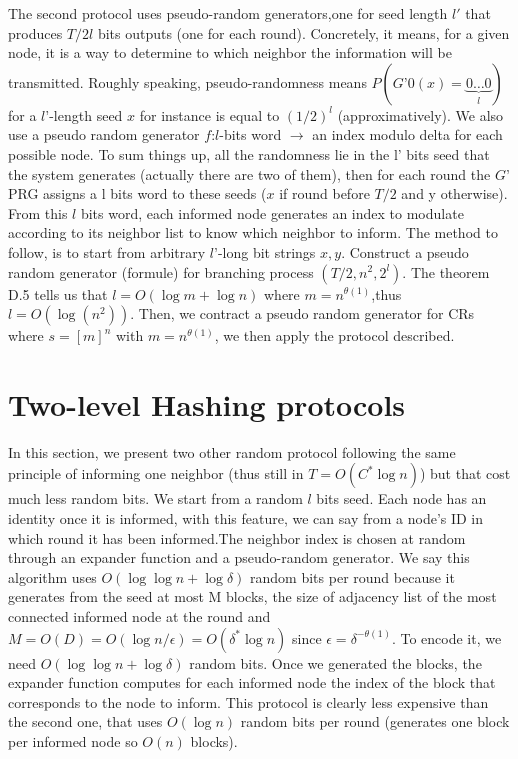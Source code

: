 \documentclass[10pt,journal,a4paper]{IEEEtran}
\begin{document}
The second protocol uses pseudo-random generators,one for seed length $l'$ that produces $T/2 l$ bits outputs (one for each round). Concretely, it means, for a given node, it is a way to determine to which neighbor the information will be transmitted. Roughly speaking, pseudo-randomness means $P(G’0(x)=\underbrace{0\dots0}_l)$ for a $l’$-length seed $x$ for instance is equal to $(1/2)^l$ (approximatively). We also use a pseudo random generator $f$:$l$-bits word $\to$ an index modulo delta for each possible node. To sum things up, all the randomness lie in the l’ bits seed that the system generates (actually there are two of them), then for each round the $G’$ PRG assigns a l bits word to these seeds ($x$ if round before $T/2$ and y otherwise). From this $l$ bits word, each informed node generates an index to modulate according to its neighbor list to know which neighbor to inform.
 The method to follow, is to start from arbitrary $l’$-long bit strings $x,y$. Construct a pseudo random generator (formule) for branching process $(T/2,n^2,2^l)$. The theorem D.5 tells us that $l=O(\log m+\log n)$ where $m=n^{\theta(1)}$,thus $l=O(\log(n^2))$. Then, we contract a pseudo random generator for CRs where $s=[m]^n$ with $m=n^{\theta(1)}$, we then apply the protocol described.
 \section{Two-level Hashing protocols}
 
 In this section, we present two other random protocol following the same principle of informing one neighbor (thus still in $T=O(C^*\log n)$) but that cost much less random bits. We start from a random $l$ bits seed. Each node has an identity once it is informed, with this feature, we can say from a node's ID in which round it has been informed.The neighbor index is chosen at random through an expander function and a pseudo-random generator. We say this algorithm uses $O(\log\log n + \log \delta)$ random bits per round because it generates from the seed at most M blocks, the size of adjacency list of the most connected informed node at the round and $M=O(D)=O(\log n / \epsilon)=O(\delta^*\log n)$ since $\epsilon=\delta^{-\theta(1)}$. To encode it, we need $O(\log\log n + \log \delta)$ random bits. Once we generated the blocks, the expander function computes for each informed node the index of the block that corresponds to the node to inform. This protocol is clearly less expensive than the second one, that uses $O(\log n)$ random bits per round (generates one block per informed node so $O(n)$ blocks).
 
\end{document}
